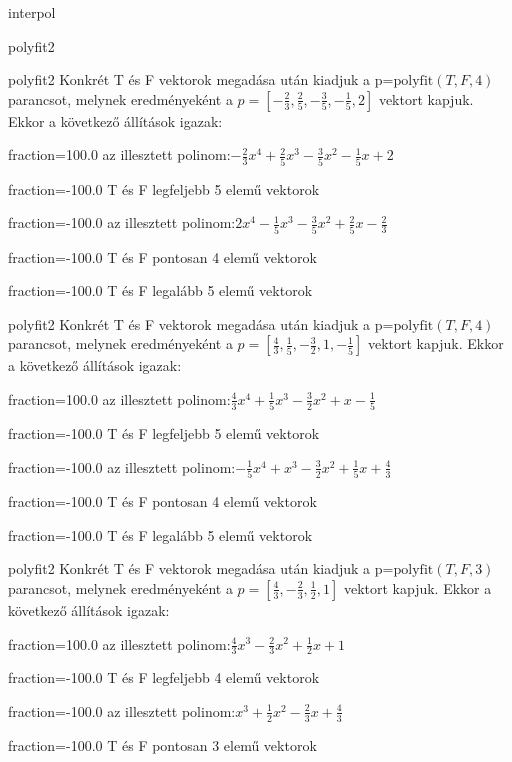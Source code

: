 \documentclass[12pt]{article}
\begin{document}
\begin{quiz}{interpol}
\begin{multi}[multiple]{polyfit2}
\end{multi}
\begin{multi}[multiple]{polyfit2}
Konkrét T és F vektorok megadása után kiadjuk a p=$\mathrm{polyfit}(T,F,4)$
parancsot, melynek eredményeként a $p=\left[-\frac{2}{3},\frac{2}{5},-\frac{3}{5},-\frac{1}{5},2\right]$ vektort kapjuk.
Ekkor a következő állítások igazak:
\item[fraction=100.0] az illesztett polinom:$-\frac{2}{3}x^4+\frac{2}{5}x^3-\frac{3}{5}x^2-\frac{1}{5}x+2$
\item[fraction=-100.0]  T és F legfeljebb 5 elemű vektorok
\item[fraction=-100.0]  az illesztett polinom:$2x^4-\frac{1}{5}x^3-\frac{3}{5}x^2+\frac{2}{5}x-\frac{2}{3}$
\item[fraction=-100.0]  T és F pontosan 4 elemű vektorok
\item[fraction=-100.0] T és F legalább 5 elemű vektorok
\end{multi}
\begin{multi}[multiple]{polyfit2}
Konkrét T és F vektorok megadása után kiadjuk a p=$\mathrm{polyfit}(T,F,4)$
parancsot, melynek eredményeként a $p=\left[\frac{4}{3},\frac{1}{5},-\frac{3}{2},1,-\frac{1}{5}\right]$ vektort kapjuk.
Ekkor a következő állítások igazak:
\item[fraction=100.0] az illesztett polinom:$\frac{4}{3}x^4+\frac{1}{5}x^3-\frac{3}{2}x^2+x-\frac{1}{5}$
\item[fraction=-100.0]  T és F legfeljebb 5 elemű vektorok
\item[fraction=-100.0]  az illesztett polinom:$-\frac{1}{5}x^4+x^3-\frac{3}{2}x^2+\frac{1}{5}x+\frac{4}{3}$
\item[fraction=-100.0]  T és F pontosan 4 elemű vektorok
\item[fraction=-100.0] T és F legalább 5 elemű vektorok
\end{multi}
\begin{multi}[multiple]{polyfit2}
Konkrét T és F vektorok megadása után kiadjuk a p=$\mathrm{polyfit}(T,F,3)$
parancsot, melynek eredményeként a $p=\left[\frac{4}{3},-\frac{2}{3},\frac{1}{2},1\right]$ vektort kapjuk.
Ekkor a következő állítások igazak:
\item[fraction=100.0] az illesztett polinom:$\frac{4}{3}x^3-\frac{2}{3}x^2+\frac{1}{2}x+1$
\item[fraction=-100.0]  T és F legfeljebb 4 elemű vektorok
\item[fraction=-100.0]  az illesztett polinom:$x^3+\frac{1}{2}x^2-\frac{2}{3}x+\frac{4}{3}$
\item[fraction=-100.0]  T és F pontosan 3 elemű vektorok

\end{multi}
\end{quiz}
\end{document}
